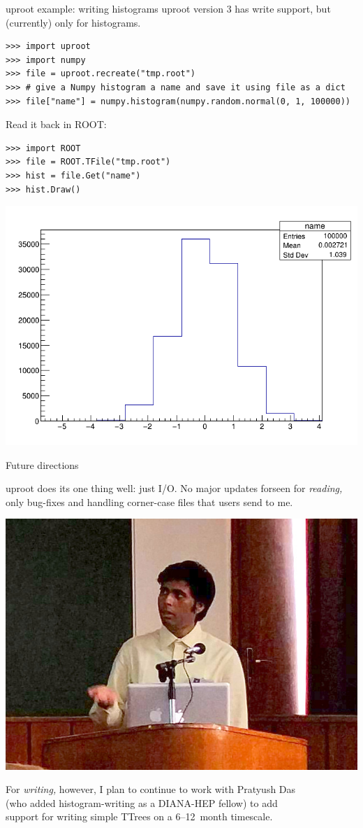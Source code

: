 \documentclass[aspectratio=169]{beamer}
\begin{document}
\begin{frame}[fragile]{uproot example: writing histograms}
\large
\vspace{0.25 cm}
uproot version 3 has write support, but (currently) only for histograms.

\small
\begin{verbatim}
>>> import uproot
>>> import numpy
>>> file = uproot.recreate("tmp.root")
>>> # give a Numpy histogram a name and save it using file as a dict
>>> file["name"] = numpy.histogram(numpy.random.normal(0, 1, 100000))
\end{verbatim}

\vspace{1 cm}
\large
Read it back in ROOT:

\small
\begin{verbatim}
>>> import ROOT
>>> file = ROOT.TFile("tmp.root")
>>> hist = file.Get("name")
>>> hist.Draw()
\end{verbatim}

\vspace{-3.5 cm}
\hfill \includegraphics[width=0.5\linewidth]{root-hist.png}
\end{frame}

\begin{frame}{Future directions}
\vspace{0.5 cm}

uproot does its one thing well: just I/O. No major updates forseen for {\it reading,} only bug-fixes and handling corner-case files that users send to me.

\vspace{0.75 cm}
\hfill \includegraphics[height=2 cm]{pratyush.jpg}

\vspace{-2 cm}
For {\it writing,} however, I plan to continue to work with Pratyush Das \\ (who added histogram-writing as a DIANA-HEP fellow) to add \\ support for writing simple TTrees on a 6--12~month timescale.

\vspace{1 cm}
\end{frame}
\end{document}

